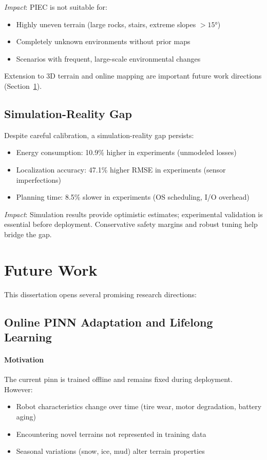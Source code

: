 \textit{Impact}: PIEC is not suitable for:
\begin{itemize}
    \item Highly uneven terrain (large rocks, stairs, extreme slopes $> 15°$)
    \item Completely unknown environments without prior maps
    \item Scenarios with frequent, large-scale environmental changes
\end{itemize}

Extension to 3D terrain and online mapping are important future work directions (Section~\ref{sec:future_work}).

\subsection{Simulation-Reality Gap}

Despite careful calibration, a simulation-reality gap persists:
\begin{itemize}
    \item Energy consumption: 10.9\% higher in experiments (unmodeled losses)
    \item Localization accuracy: 47.1\% higher RMSE in experiments (sensor imperfections)
    \item Planning time: 8.5\% slower in experiments (OS scheduling, I/O overhead)
\end{itemize}

\textit{Impact}: Simulation results provide optimistic estimates; experimental validation is essential before deployment. Conservative safety margins and robust tuning help bridge the gap.

\section{Future Work}
\label{sec:future_work}

This dissertation opens several promising research directions:

\subsection{Online PINN Adaptation and Lifelong Learning}

\paragraph{Motivation}
The current \acrshort{pinn} is trained offline and remains fixed during deployment. However:
\begin{itemize}
    \item Robot characteristics change over time (tire wear, motor degradation, battery aging)
    \item Encountering novel terrains not represented in training data
    \item Seasonal variations (snow, ice, mud) alter terrain properties
\end{itemize}

